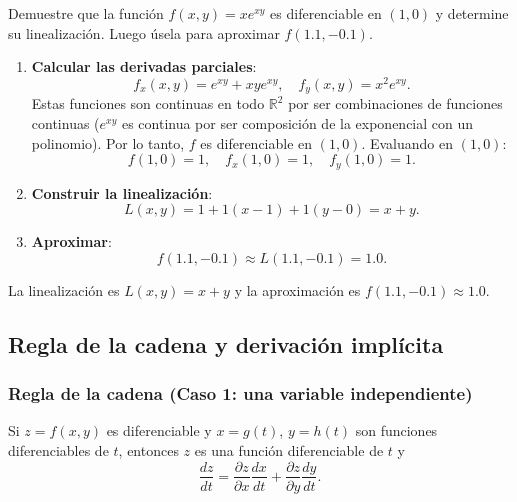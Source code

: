 \begin{example}
Demuestre que la función $f(x, y) = x e^{xy}$ es diferenciable en $(1, 0)$ y determine su linealización. Luego úsela para aproximar $f(1.1, -0.1)$.
\end{example}
\begin{myproof}
\begin{enumerate}
    \item \textbf{Calcular las derivadas parciales}:
    \[
    f_x(x, y) = e^{xy} + xy e^{xy}, \quad f_y(x, y) = x^2 e^{xy}.
    \]
    Estas funciones son continuas en todo $\mathbb{R}^2$ por ser combinaciones de funciones continuas ($e^{xy}$ es continua por ser composición de la exponencial con un polinomio). Por lo tanto, $f$ es diferenciable en $(1, 0)$.
    Evaluando en $(1, 0)$:
    \[
    f(1, 0) = 1,\quad f_x(1, 0) = 1,\quad f_y(1, 0) = 1.
    \]

    \item \textbf{Construir la linealización}:
    \[
    L(x, y) = 1 + 1(x - 1) + 1(y - 0) = x + y.
    \]

    \item \textbf{Aproximar}:
    \[
    f(1.1, -0.1) \approx L(1.1, -0.1) = 1.0.
    \]
\end{enumerate}
La linealización es $\boxed{L(x, y) = x + y}$ y la aproximación es $\boxed{f(1.1, -0.1) \approx 1.0}$.
\end{myproof}

\subsection{Regla de la cadena y derivación implícita}

\subsubsection{Regla de la cadena (Caso 1: una variable independiente)}

\begin{theorem}
Si $z = f(x, y)$ es diferenciable y $x = g(t)$, $y = h(t)$ son funciones diferenciables de $t$, entonces $z$ es una función diferenciable de $t$ y
\[
\frac{dz}{dt} = \frac{\partial z}{\partial x}\frac{dx}{dt} + \frac{\partial z}{\partial y}\frac{dy}{dt}.
\]
\end{theorem}

